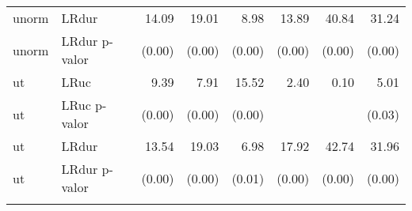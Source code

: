 \begin{longtable}{llrrrrrr}
  unorm & LRdur & 14.09 & 19.01 & 8.98 & 13.89 & 40.84 & 31.24 \\ 
  unorm & LRdur p-valor & (0.00) & (0.00) & (0.00) & (0.00) & (0.00) & (0.00) \\ 
  ut & LRuc & 9.39 & 7.91 & 15.52 & 2.40 & 0.10 & 5.01 \\ 
  ut & LRuc p-valor & (0.00) & (0.00) & (0.00) &  &  & (0.03) \\ 
  ut & LRdur & 13.54 & 19.03 & 6.98 & 17.92 & 42.74 & 31.96 \\ 
  ut & LRdur p-valor & (0.00) & (0.00) & (0.01) & (0.00) & (0.00) & (0.00) \\ 
   \bottomrule
\label{tab:vartest}
\end{longtable}
